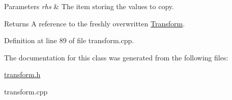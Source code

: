 \begin{DoxyParams}{Parameters}
{\em rhs} & The item storing the values to copy. \\
\hline
\end{DoxyParams}
\begin{DoxyReturn}{Returns}
A reference to the freshly overwritten \hyperlink{classMezzanine_1_1Transform}{Transform}. 
\end{DoxyReturn}


Definition at line 89 of file transform.cpp.



The documentation for this class was generated from the following files:\begin{DoxyCompactItemize}
\item 
\hyperlink{transform_8h}{transform.h}\item 
transform.cpp\end{DoxyCompactItemize}
